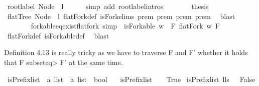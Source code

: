 \begin{isabellebody}
\ {\isachardoublequoteopen}root{\isacharunderscore}label{\isacharunderscore}{}\ {\isacharparenleft}Node\ {}\ l{\isacharparenright}{\isachardoublequoteclose}\isanewline
\ \ \ \ \isamarkupfalse%
\ {\isacharparenleft}simp\ add{\isacharcolon}\ root{\isacharunderscore}label{\isacharunderscore}{}{\isachardot}intros{\isacharparenright}\ \ \isanewline
\ \ \isamarkupfalse%
\ \isamarkupfalse%
\ {\isacharquery}thesis\isanewline
\ \ \ \ \isamarkupfalse%
\ {\isacartoucheopen}flatTree\ {\isacharparenleft}Node\ {}\ l{\isacharparenright}{\isacartoucheclose}\ flatFork{\isacharunderscore}def\ isFork{\isachardot}elims{\isacharparenleft}{}{\isacharparenright}\ prem{}\ prem{}\ prem{}\ prem{}\ \isamarkupfalse%
\ blast\isanewline
{}\isamarkupfalse%
%
\endisatagproof
{\isafoldproof}%
%
\isadelimproof
\isanewline
%
\endisadelimproof
\ \ \ \ \ \ \isanewline
{}\isamarkupfalse%
\ forkable{\isacharunderscore}eq{\isacharunderscore}exist{\isacharunderscore}flatfork\ {\isacharbrackleft}simp{\isacharbrackright}\ {\isacharcolon}\ {\isachardoublequoteopen}isForkable\ w\ {\isasymlongleftrightarrow}\ {\isacharparenleft}{\isasymexists}F{\isachardot}\ flatFork\ w\ F{\isacharparenright}{\isachardoublequoteclose}\isanewline
%
\isadelimproof
\ \ %
\endisadelimproof
%
\isatagproof
{}\isamarkupfalse%
\ flatFork{\isacharunderscore}def\ isForkable{\isacharunderscore}def\ \isamarkupfalse%
\ blast%
\endisatagproof
{\isafoldproof}%
%
\isadelimproof
%
\endisadelimproof
%
\begin{isamarkuptext}%
Definition 4.13 is really tricky as we have to traverse F and F' whether it holds that F \<subseteq> F' at 
the same time.%
\end{isamarkuptext}\isamarkuptrue%
\isamarkupfalse%
\ isPrefix{\isacharunderscore}list\ {\isacharcolon}{\isacharcolon}\ {\isachardoublequoteopen}{\isacharprime}a\ list\ {\isasymRightarrow}\ {\isacharprime}a\ list\ {\isasymRightarrow}\ bool{\isachardoublequoteclose}\ \isanewline
\ \ {\isachardoublequoteopen}isPrefix{\isacharunderscore}list\ {\isacharbrackleft}{\isacharbrackright}\ {\isacharunderscore}\ {\isacharequal}\ True{\isachardoublequoteclose}\isanewline
{\isacharbar}\ {\isachardoublequoteopen}isPrefix{\isacharunderscore}list\ {\isacharparenleft}l{\isacharhash}ls{\isacharparenright}\ {\isacharbrackleft}{\isacharbrackright}\ {\isacharequal}\ False{\isachardoublequoteclose}\isanewline

\end{isabellebody}
